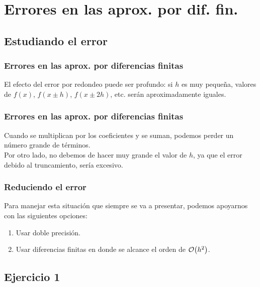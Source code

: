 \documentclass[12pt]{beamer}
\begin{document}
\section{Errores en las aprox. por dif. fin.}
\subsection{Estudiando el error}

\begin{frame}
\frametitle{Errores en las aprox. por diferencias finitas}
El efecto del error por redondeo puede ser profundo: \pause si $h$ es muy pequeña, valores de $f(x)$, $f (x \pm h)$, $f (x \pm 2h)$, etc. serán aproximadamente iguales.
\end{frame}
\begin{frame}
\frametitle{Errores en las aprox. por diferencias finitas}
Cuando se multiplican por los coeficientes y se suman, podemos perder un número grande de términos.
\\
\bigskip
\pause
Por otro lado, no debemos de hacer muy grande el valor de $h$, ya que el error debido al truncamiento, sería excesivo.
\end{frame}
\begin{frame}
\frametitle{Reduciendo el error}
Para manejar esta situación que siempre se va a presentar, podemos apoyarnos con las siguientes opciones:
\begin{enumerate}[<+->]
\item Usar doble precisión.
\item Usar diferencias finitas en donde se alcance el orden de $\order{h^{2}}$.
\end{enumerate}
\end{frame}

\subsection{Ejercicio 1}
\end{document}
